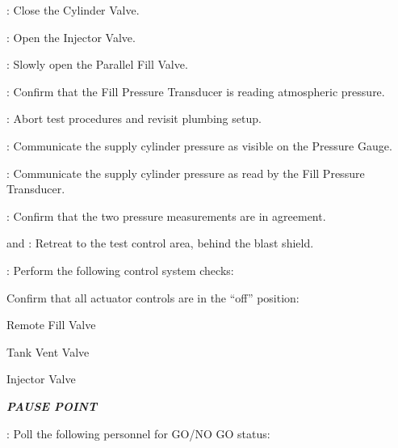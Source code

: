 \begin{checklist}
\begin{checklist}[label=$\bullet$]
        \begin{checklist}
            \item \primary{}: Close the Cylinder Valve.
            \item \primary{}: Open the Injector Valve.
            \item \primary{}: Slowly open the Parallel Fill Valve.
            \item \daq{}: Confirm that the Fill Pressure Transducer is reading atmospheric pressure.
            \item \ops{}: Abort test procedures and revisit plumbing setup.
        \end{checklist}
    \end{checklist}
    \item \primary{}: Communicate the supply cylinder pressure as visible on the Pressure Gauge.
    \item \daq{}: Communicate the supply cylinder pressure as read by the Fill Pressure Transducer.
    \item \daq{}: Confirm that the two pressure measurements are in agreement.
    \item \primary{} and \secondary: Retreat to the test control area, behind the blast shield.
    \item \primary{}: Perform the following control system checks:
    \begin{checklist}
        \item Confirm that all actuator controls are in the ``off'' position:
        \begin{checklist}
            \item Remote Fill Valve
            \item Tank Vent Valve
            \item Injector Valve
        \end{checklist}
    \end{checklist}
    \item \textbf{\textit{PAUSE POINT}}
    \item \ops{}: Poll the following personnel for GO/NO GO status:
    \begin{checklist}
        \item \peri{}
        \item \perii{}
        \item \heat
        \item \daq{}
        \item \primary{}
        \item \secondary

\end{checklist}
\end{checklist}
